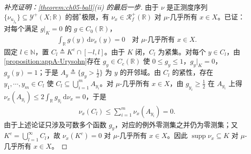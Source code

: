 \documentclass[../../main.tex]{subfiles}%
\begin{document}
\begin{proof}[补充证明：\cref{theorem:ch05-ball}(ii) 的最后一步]
由于 $\nu$ 是正测度序列 $\{\nu_{u_{j_k}}\}\subseteq\mathcal{Y}^+(X;\mathbb{R})$ 的弱$^*$极限，有 $\nu_x\in\mathscr{R}^+_f(\mathbb{R})$ 对 $\mu$-几乎所有 $x\in X$。已证：对每个满足 $g|_K=0$ 的 $g\in C_0(\mathbb{R})$，
\begin{align*}
\int_{\mathbb{R}}g(y)\,\mathrm{d}\nu_x(y)=0\quad\text{对 }\mu\text{-几乎所有 }x\in X.
\end{align*}
固定 $l\in\mathbb{N}$，置 $C_l\triangleq K^c\cap[-l,l]$。由于 $K$ 闭，$C_l$ 为紧集。对每个 $y\in C_l$，由\cref{proposition:appA-Urysohn}存在 $g_y\in C_c(\mathbb{R})$ 使 $0\leqslant g_y\leqslant1$，$g_y|_K=0$，$g_y(y)=1$；于是 $A_y\triangleq\{g_y>\tfrac12\}$ 为 $y$ 的开邻域。由 $C_l$ 的紧性，存在 $y_1,\cdots,y_m\in C_l$ 使 $C_l\subseteq\bigcup_{i=1}^mA_{y_i}$。对 $\mu$-几乎所有 $x\in X$，由 $g_{y_i}\geqslant\tfrac12$ 在 $A_{y_i}$ 上得 $\nu_x(A_{y_i})\leqslant2\int_{\mathbb{R}}g_{y_i}\,\mathrm{d}\nu_x=0$，于是
\begin{align*}
\nu_x(C_l)\leqslant\sum_{i=1}^m\nu_x(A_{y_i})=0.
\end{align*}
由于上述论证只涉及可数多个函数 $g_y$，对应的例外零测集之并仍为零测集；又 $K^c=\bigcup_{l=1}^\infty C_l$，故 $\nu_x(K^c)=0$ 对 $\mu$-几乎所有 $x\in X$。因此 $\operatorname{supp}\nu_x\subseteq K$ 对 $\mu$-几乎所有 $x\in X$。
\end{proof}
\end{document}
